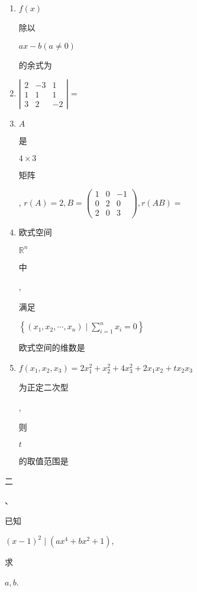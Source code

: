 \documentclass[10pt]{article}
\begin{document}
\begin{enumerate}
  \item $f(x)$ \begin{CJK}{UTF8}{mj}除以\end{CJK} $a x-b(a \neq 0)$ \begin{CJK}{UTF8}{mj}的余式为\end{CJK}

  \item $\left|\begin{array}{ccc}2 & -3 & 1 \\ 1 & 1 & 1 \\ 3 & 2 & -2\end{array}\right|=$

  \item $A$ \begin{CJK}{UTF8}{mj}是\end{CJK} $4 \times 3$ \begin{CJK}{UTF8}{mj}矩阵\end{CJK}, $r(A)=2, B=\left(\begin{array}{ccc}1 & 0 & -1 \\ 0 & 2 & 0 \\ 2 & 0 & 3\end{array}\right), r(A B)=$

  \item \begin{CJK}{UTF8}{mj}欧式空间\end{CJK} $\mathbb{R}^{n}$ \begin{CJK}{UTF8}{mj}中\end{CJK}, \begin{CJK}{UTF8}{mj}满足\end{CJK} $\left\{\left(x_{1}, x_{2}, \cdots, x_{n}\right) \mid \sum_{i=1}^{n} x_{i}=0\right\}$ \begin{CJK}{UTF8}{mj}欧式空间的维数是\end{CJK}

  \item $f\left(x_{1}, x_{2}, x_{3}\right)=2 x_{1}^{2}+x_{2}^{2}+4 x_{3}^{2}+2 x_{1} x_{2}+t x_{2} x_{3}$ \begin{CJK}{UTF8}{mj}为正定二次型\end{CJK}, \begin{CJK}{UTF8}{mj}则\end{CJK} $t$ \begin{CJK}{UTF8}{mj}的取值范围是\end{CJK}

\end{enumerate}
\begin{CJK}{UTF8}{mj}二\end{CJK}、\begin{CJK}{UTF8}{mj}已知\end{CJK} $(x-1)^{2} \mid\left(a x^{4}+b x^{2}+1\right)$, \begin{CJK}{UTF8}{mj}求\end{CJK} $a, b$.
\end{document}

